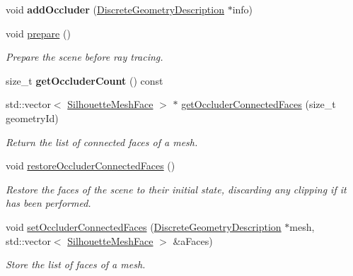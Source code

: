 \begin{DoxyCompactItemize}
\item 
\mbox{\label{classvisilib_1_1_geometry_occluder_set_a0d3103cdce2ceff0f68949f64ec5607f}} 
void {\bfseries add\+Occluder} (\mbox{\hyperlink{structvisilib_1_1_discrete_geometry_description}{Discrete\+Geometry\+Description}} $\ast$info)
\item 
\mbox{\label{classvisilib_1_1_geometry_occluder_set_a9ad0f12014c07ed08cdd6be981faf704}} 
void \mbox{\hyperlink{classvisilib_1_1_geometry_occluder_set_a9ad0f12014c07ed08cdd6be981faf704}{prepare}} ()
\begin{DoxyCompactList}\small\item\em Prepare the scene before ray tracing. \end{DoxyCompactList}\item 
\mbox{\label{classvisilib_1_1_geometry_occluder_set_a6b4c7066a4ef012501748501f3d2febc}} 
size\+\_\+t {\bfseries get\+Occluder\+Count} () const
\item 
std\+::vector$<$ \mbox{\hyperlink{classvisilib_1_1_silhouette_mesh_face}{Silhouette\+Mesh\+Face}} $>$ $\ast$ \mbox{\hyperlink{classvisilib_1_1_geometry_occluder_set_a48bcbc4a98511777faf8fa006343d6a3}{get\+Occluder\+Connected\+Faces}} (size\+\_\+t geometry\+Id)
\begin{DoxyCompactList}\small\item\em Return the list of connected faces of a mesh. \end{DoxyCompactList}\item 
\mbox{\label{classvisilib_1_1_geometry_occluder_set_a01d2de1cfec62e4000ca3b5b262ae4bb}} 
void \mbox{\hyperlink{classvisilib_1_1_geometry_occluder_set_a01d2de1cfec62e4000ca3b5b262ae4bb}{restore\+Occluder\+Connected\+Faces}} ()
\begin{DoxyCompactList}\small\item\em Restore the faces of the scene to their initial state, discarding any clipping if it has been performed. \end{DoxyCompactList}\item 
void \mbox{\hyperlink{classvisilib_1_1_geometry_occluder_set_a4700b3241185a0c1064a2a227d771d99}{set\+Occluder\+Connected\+Faces}} (\mbox{\hyperlink{structvisilib_1_1_discrete_geometry_description}{Discrete\+Geometry\+Description}} $\ast$mesh, std\+::vector$<$ \mbox{\hyperlink{classvisilib_1_1_silhouette_mesh_face}{Silhouette\+Mesh\+Face}} $>$ \&a\+Faces)
\begin{DoxyCompactList}\small\item\em Store the list of faces of a mesh. \end{DoxyCompactList}\end{DoxyCompactItemize}
